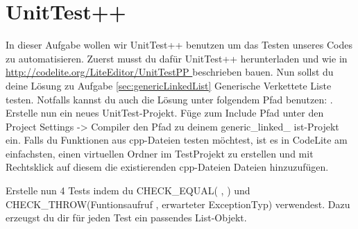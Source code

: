 \section{\ExercisePrefixAdvanced UnitTest++ \optional}\label{sec:unit_test}
\optionaltextbox
{}

In dieser Aufgabe wollen wir UnitTest++ benutzen um das Testen unseres Codes zu automatisieren.
Zuerst musst du dafür UnitTest++ herunterladen und wie in \url{http://codelite.org/LiteEditor/UnitTestPP } beschrieben bauen.
Nun sollst du deine Lösung zu Aufgabe \ref{sec:genericLinkedList} Generische Verkettete Liste testen. 
Notfalls kannst du auch die Lösung unter folgendem Pfad benutzen: . 
Erstelle nun ein neues UnitTest-Projekt. 
Füge zum Include Pfad unter den Project Settings -> Compiler den Pfad zu deinem generic\_linked\_ ist-Projekt ein. 
Falls du Funktionen aus cpp-Dateien testen möchtest, ist es in CodeLite am einfachsten, einen virtuellen Ordner im TestProjekt zu erstellen und mit Rechtsklick auf diesem die existierenden cpp-Dateien Dateien hinzuzufügen.

Erstelle nun 4 Tests indem du CHECK\_EQUAL( , ) und CHECK\_THROW(Funtionsaufruf , erwarteter ExceptionTyp) verwendest. Dazu erzeugst du dir für jeden Test ein passendes List-Objekt.
 
 

